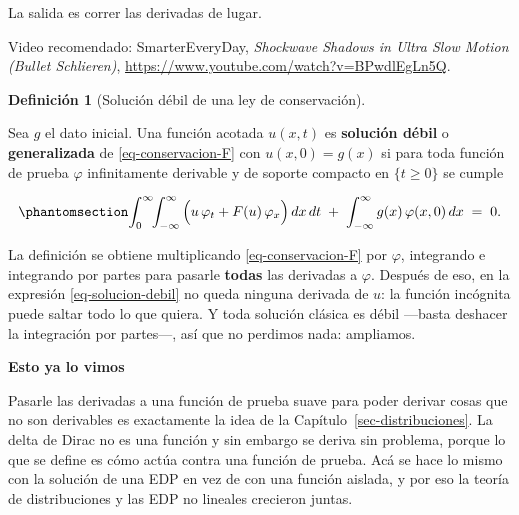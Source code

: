 \documentclass[
  spanish,
  a4paper,
]{scrbook}
\theoremstyle{definition}
\newtheorem{definition}{Definición}[chapter]
\theoremstyle{plain}
\theoremstyle{definition}
\theoremstyle{plain}
\theoremstyle{definition}
\theoremstyle{remark}
\begin{document}
La salida es correr las derivadas de lugar.

Video recomendado: SmarterEveryDay, \emph{Shockwave Shadows in Ultra
Slow Motion (Bullet Schlieren)},
\url{https://www.youtube.com/watch?v=BPwdlEgLn5Q}.

\begin{definition}[Solución débil de una ley de
conservación]\protect\hypertarget{def-solucion-debil}{}\label{def-solucion-debil}

Sea \(g\) el dato inicial. Una función acotada \(u(x,t)\) es
\textbf{solución débil} o \textbf{generalizada} de
\ref{eq-conservacion-F} con \(u(x,0)=g(x)\) si para toda función de
prueba \(\varphi\) infinitamente derivable y de soporte compacto en
\(\{t \ge 0\}\) se cumple

\begin{equation}\protect\phantomsection\label{eq-solucion-debil}{
\int_0^{\infty}\!\!\int_{-\infty}^{\infty}
\Big( u\,\varphi_t + F(u)\,\varphi_x \Big)\,dx\,dt
\;+\; \int_{-\infty}^{\infty} g(x)\,\varphi(x,0)\,dx \;=\; 0 .
}\end{equation}

\end{definition}

La definición se obtiene multiplicando \ref{eq-conservacion-F} por
\(\varphi\), integrando e integrando por partes para pasarle
\textbf{todas} las derivadas a \(\varphi\). Después de eso, en la
expresión \ref{eq-solucion-debil} no queda ninguna derivada de \(u\): la
función incógnita puede saltar todo lo que quiera. Y toda solución
clásica es débil ---basta deshacer la integración por partes---, así que
no perdimos nada: ampliamos.

\begin{tcolorbox}[enhanced jigsaw, arc=.35mm, bottomrule=.15mm, breakable, colback=white, colframe=quarto-callout-tip-color-frame, left=2mm, leftrule=.75mm, opacityback=0, rightrule=.15mm, toprule=.15mm]
\begin{minipage}[t]{5.5mm}
\textcolor{quarto-callout-tip-color}{\faLightbulb}
\end{minipage}%
\begin{minipage}[t]{\textwidth - 5.5mm}

\vspace{-3mm}\textbf{Esto ya lo vimos}\vspace{3mm}

Pasarle las derivadas a una función de prueba suave para poder derivar
cosas que no son derivables es exactamente la idea de la
Capítulo~\ref{sec-distribuciones}. La delta de Dirac no es una función y
sin embargo se deriva sin problema, porque lo que se define es cómo
actúa contra una función de prueba. Acá se hace lo mismo con la solución
de una EDP en vez de con una función aislada, y por eso la teoría de
distribuciones y las EDP no lineales crecieron juntas.

\end{minipage}%
\end{tcolorbox}
\end{document}
